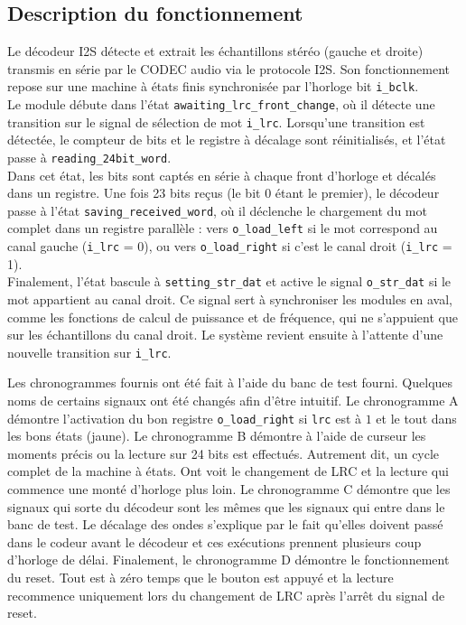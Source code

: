 

\subsection{Description du fonctionnement}

Le décodeur I2S détecte et extrait les échantillons stéréo (gauche et droite)
transmis en série par le CODEC audio via le protocole I2S. Son
fonctionnement repose sur une machine à états finis synchronisée par
l'horloge bit \verb|i_bclk|.\\

Le module débute dans l'état \verb|awaiting_lrc_front_change|, où il détecte
une transition sur le signal de sélection de mot \verb|i_lrc|. Lorsqu'une transition
est détectée, le compteur de bits et le registre à décalage sont réinitialisés,
et l'état passe à \verb|reading_24bit_word|.\\

Dans cet état, les bits sont captés en série à chaque front d'horloge et
décalés dans un registre. Une fois 23 bits reçus (le bit 0 étant le premier),
le décodeur passe à l'état \verb|saving_received_word|, où il déclenche le chargement
du mot complet dans un registre parallèle : vers \verb|o_load_left| si le mot
correspond au canal gauche (\verb|i_lrc| = 0), ou vers \verb|o_load_right| si
c'est le canal droit (\verb|i_lrc| = 1).\\

Finalement, l'état bascule à \verb|setting_str_dat| et active le signal \verb|o_str_dat| si le mot
appartient au canal droit. Ce signal sert à synchroniser les modules en aval,
comme les fonctions de calcul de puissance et de fréquence, qui ne s'appuient
que sur les échantillons du canal droit. Le système revient ensuite à l'attente
d'une nouvelle transition sur \verb|i_lrc|.

Les chronogrammes fournis ont été fait à l'aide du banc de test fourni. Quelques noms de certains signaux ont été changés afin d'être intuitif. Le chronogramme A démontre l'activation du bon registre \verb|o_load_right| si \verb|lrc| est à $1$ et le tout dans les bons états (jaune). Le chronogramme B démontre à l'aide de curseur les moments précis ou la lecture sur 24 bits est effectués. Autrement dit, un cycle complet de la machine à états. Ont voit le changement de LRC et la lecture qui commence une monté d'horloge plus loin. Le chronogramme C démontre que les signaux qui sorte du décodeur sont les mêmes que les signaux qui entre dans le banc de test. Le décalage des ondes s'explique par le fait qu'elles doivent passé dans le codeur avant le décodeur et ces exécutions prennent plusieurs coup d'horloge de délai. Finalement, le chronogramme D démontre le fonctionnement du reset. Tout est à zéro temps que le bouton est appuyé et la lecture recommence uniquement lors du changement de LRC après l'arrêt du signal de reset.

